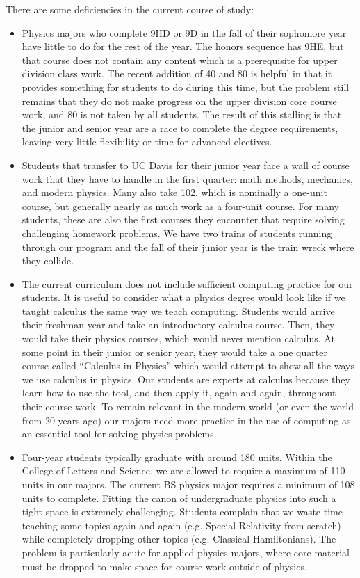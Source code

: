 \documentclass[12pt]{article}
\begin{document}
There are some deficiencies in the current course of study:
\begin{itemize}

\item Physics majors who complete 9HD or 9D in the fall of their
  sophomore year have little to do for the rest of the year.  The
  honors sequence has 9HE, but that course does not contain any
  content which is a prerequisite for upper division class work.  The
  recent addition of 40 and 80 is helpful in that it provides
  something for students to do during this time, but the problem still
  remains that they do not make progress on the upper division core
  course work, and 80 is not taken by all students.  The result of
  this stalling is that the junior and senior year are a race to
  complete the degree requirements, leaving very little flexibility or
  time for advanced electives.

\item Students that transfer to UC Davis for their junior year face a
  wall of course work that they have to handle in the first quarter:
  math methods, mechanics, and modern physics.  Many also take 102,
  which is nominally a one-unit course, but generally nearly as much
  work as a four-unit course.  For many students, these are also the
  first courses they encounter that require solving challenging
  homework problems.  We have two trains of students running through
  our program and the fall of their junior year is the train wreck
  where they collide.

\item The current curriculum does not include sufficient computing
  practice for our students.  It is useful to consider what a physics
  degree would look like if we taught calculus the same way we teach
  computing.  Students would arrive their freshman year and take an
  introductory calculus course.  Then, they would take their physics
  courses, which would never mention calculus.  At some point in their
  junior or senior year, they would take a one quarter course called
  ``Calculus in Physics'' which would attempt to show all the ways we
  use calculus in physics.  Our students are experts at calculus
  because they learn how to use the tool, and then apply it, again and
  again, throughout their course work.  To remain relevant in the
  modern world (or even the world from 20 years ago) our majors need
  more practice in the use of computing as an essential tool for
  solving physics problems.

\item Four-year students typically graduate with around 180 units.
  Within the College of Letters and Science, we are allowed to require
  a maximum of 110 units in our majors.  The current BS physics major
  requires a minimum of 108 units to complete.  Fitting the canon of
  undergraduate physics into such a tight space is extremely
  challenging.  Students complain that we waste time teaching some
  topics again and again (e.g. Special Relativity from scratch) while
  completely dropping other topics (e.g. Classical Hamiltonians).  The
  problem is particularly acute for applied physics majors, where core
  material must be dropped to make space for course work outside of
  physics.


\end{itemize}
\end{document}

